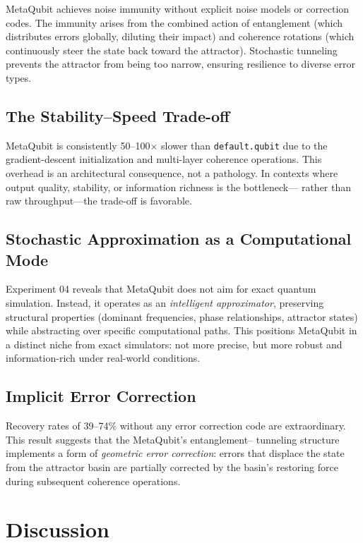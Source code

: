 \documentclass[twocolumn,amsmath,amssymb,prl]{revtex4-2}
\begin{document}
MetaQubit achieves noise immunity without explicit noise models or correction
codes.  The immunity arises from the combined action of entanglement (which
distributes errors globally, diluting their impact) and coherence rotations
(which continuously steer the state back toward the attractor).  Stochastic
tunneling prevents the attractor from being too narrow, ensuring resilience to
diverse error types.

\subsection{The Stability–Speed Trade-off}

MetaQubit is consistently 50--100$\times$ slower than \texttt{default.qubit}
due to the gradient-descent initialization and multi-layer coherence operations.
This overhead is an architectural consequence, not a pathology.  In contexts
where output quality, stability, or information richness is the bottleneck—
rather than raw throughput—the trade-off is favorable.

\subsection{Stochastic Approximation as a Computational Mode}

Experiment 04 reveals that MetaQubit does not aim for exact quantum
simulation.  Instead, it operates as an \emph{intelligent approximator},
preserving structural properties (dominant frequencies, phase relationships,
attractor states) while abstracting over specific computational paths.  This
positions MetaQubit in a distinct niche from exact simulators: not more
precise, but more robust and information-rich under real-world conditions.

\subsection{Implicit Error Correction}

Recovery rates of 39--74\% without any error correction code are
extraordinary.  This result suggests that the MetaQubit's entanglement–
tunneling structure implements a form of \emph{geometric error correction}:
errors that displace the state from the attractor basin are partially
corrected by the basin's restoring force during subsequent coherence
operations.

\section{Discussion}
\label{sec:discussion}
\end{document}
